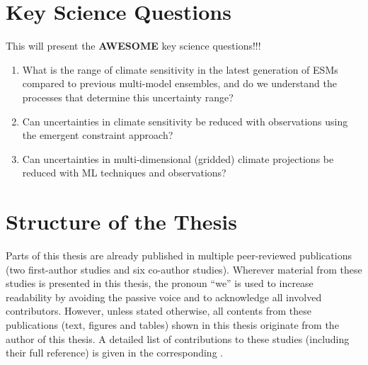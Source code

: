 \section{Key Science Questions}
\label{sec:01:key_science_questions}

This  will present the \textbf{AWESOME}
key science questions!!!

\begingroup
{}
\begin{enumerate}
  \item \label{enum:01:question_1} What is the range of climate sensitivity in
  the latest generation of \acp{ESM} compared to previous multi-model
  ensembles, and do we understand the processes that determine this
  uncertainty range?

  \item \label{enum:01:question_2} Can uncertainties in climate sensitivity be
  reduced with observations using the emergent constraint approach?

  \item \label{enum:01:question_3} Can uncertainties in multi-dimensional
  (gridded) climate projections be reduced with \ac{ML} techniques and
  observations?
\end{enumerate}
\endgroup


\section{Structure of the Thesis}
\label{sec:01:structure}

Parts of this thesis are already published in multiple peer-reviewed
publications (two first-author studies and six co-author studies). Wherever
material from these studies is presented in this thesis, the pronoun
\enquote{we} is used to increase readability by avoiding the passive voice and
to acknowledge all involved contributors. However, unless stated otherwise, all
contents from these publications (text, figures and tables) shown in this
thesis originate from the author of this thesis. A detailed list of
contributions to these studies (including their full reference) is given in the
corresponding .

